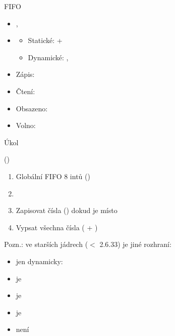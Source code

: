 \begin{frame}{FIFO}

  \begin{itemize}
    \item {}, 
    \item {}
    \begin{itemize}
      \item Statické:  + 
      \item Dynamické: ,
    \end{itemize}

    \pause

    \item Zápis: 
    \item Čtení: 

    \pause

    \item Obsazeno: 
    \item Volno: 
  \end{itemize}

\end{frame}

\begin{frame}{Úkol}

   ()
  \begin{enumerate}
    \item Globální FIFO 8 intů ()
    \item {}
    \item Zapisovat čísla () dokud je místo
    \item Vypsat všechna čísla ( + )
  \end{enumerate}

  \bigskip

  Pozn.: ve starších jádrech ($<$ 2.6.33) je jiné rozhraní:
  \begin{itemize}
    \item jen dynamicky: 
    \item {} je 
    \item {} je 
    \item {} je 
    \item {} není
  \end{itemize}

\end{frame}

